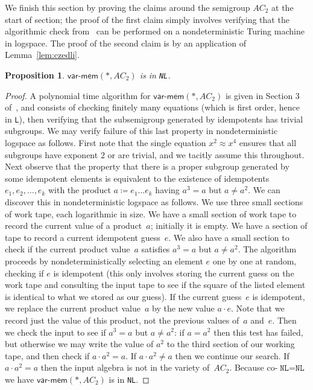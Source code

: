 \documentclass[reqno]{amsart}
\theoremstyle{plain}
\newtheorem{pro}[thm]{Proposition}
\theoremstyle{definition}
\newcommand{\varmem}{\textsf{var-mem}}
\begin{document}
We finish this  section by proving the claims around the semigroup $AC_2$ at the start of section; the  proof of the first claim simply involves verifying that the algorithmic check from~\cite{VGK} can be performed on a nondeterministic Turing machine in logspace.  The  proof of the second claim is by an application of Lemma~\ref{lem:czedli}.
\begin{pro}\label{pro:AC2}
$\varmem(*,AC_2)$ is in \texttt{NL}.
\end{pro}
\begin{proof}
A polynomial time algorithm for $\varmem(*,AC_2)$ is given in Section 3 of~\cite{VGK}, and consists of checking finitely many equations (which is first order, hence in \texttt{L}), then verifying that the subsemigroup generated by idempotents has trivial subgroups.  
We may verify failure of this last property in nondeterministic logspace as follows. 
First note that the single equation $x^2\approx x^4$ ensures that all subgroups have exponent $2$ or are trivial, and we tacitly assume this throughout.  
Next observe that the property that there is a proper subgroup generated by some idempotent elements is equivalent to the existence of idempotents $e_1,e_2,\dots,e_k$ with the product $a\coloneqq e_1\dots e_k$ having $a^3=a$ but $a\neq a^2$.  
We can discover this in nondeterministic logspace as follows.  
We use three small sections of work tape, each logarithmic in size.  We have a small section of work tape to record the current value of a product~$a$; initially it is empty.  
We have a section of tape to record a current idempotent guess~$e$.  
We also have a small section to check if the current product value~$a$ satisfies $a^3=a$ but $a\neq a^2$.  
The algorithm proceeds by nondeterministically selecting an element $e$ one by one at random, checking if $e$ is idempotent (this only involves storing the current guess on the work tape and consulting the input tape to see if the square of the listed element is identical to what we stored as our guess).  
If the current guess~$e$ is idempotent, we replace the current product value~$a$ by the new value $a\cdot e$.  
Note that we record just the value of this product, not the previous values of~$a$ and~$e$.  
Then we check the input to see if $a^3=a$ but $a\neq a^2$: if $a=a^2$ then this test has failed, but otherwise we may write the value of $a^2$ to the third section of our working tape, and then check if $a\cdot a^2=a$.  
If $a\cdot a^2\neq a$ then we continue our search.  
If $a\cdot a^2= a$ then the input algebra is not in the variety of~$AC_2$.  
Because co-$\texttt{NL}=\texttt{NL}$ we have  $\varmem(*,AC_2)$ is in \texttt{NL}.
\end{proof}
\end{document}
